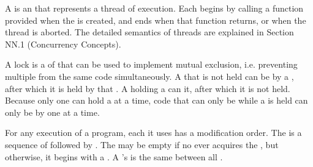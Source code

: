 \endsubsection%


A  is an  that represents a thread of
execution. Each  begins by calling a function provided
when the  is created, and ends when that function returns, or
when the thread is aborted. The detailed semantics of threads are
explained in Section NN.1 (Concurrency Concepts).


\endsubsection%


A lock is a  of  that can be used to
implement mutual exclusion, i.e. preventing multiple 
from  the same code simultaneously.
 A  that is not held can be
 by a , after which it is held by that
. A  holding a  can
 it, after which it is not held. Because only one
 can hold a  at a time, code that can only be
 while a  is held can only be
 by one  at a time.



For any execution of a program, each  it uses has a
modification order. The  is a sequence of
 followed by . The
 may be empty if no  ever
acquires the , but otherwise, it begins with a . A 's  is the same
between all .

